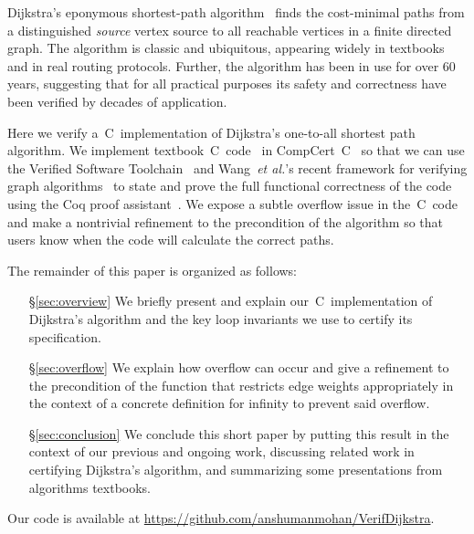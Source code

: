 Dijkstra's eponymous shortest-path algorithm~\cite{DBLP:journals/nm/Dijkstra59} finds
the cost-minimal paths from a distinguished \emph{source} vertex
source to all reachable vertices in a finite directed graph.
The algorithm is classic and ubiquitous, appearing widely in textbooks~\cite{clrs}
and in real routing protocols. Further, the algorithm has been in
use for over $60$ years, suggesting that for all practical purposes
its safety and correctness have been verified by decades of application.


Here we verify a~C~implementation of Dijkstra's one-to-all shortest path algorithm.
We implement textbook~C~code~\cite{clrs} in CompCert~C~\cite{leroy:compcert} so that
we can use the Verified Software Toolchain~\cite{appel:programlogics} and
Wang~\emph{et al.}'s recent framework for verifying graph algorithms~\cite{DBLP:journals/pacmpl/WangCMH19} to state and prove the full functional
correctness of the code using the Coq proof assistant~\cite{coq}.
We expose a subtle overflow issue in the~C~code and make a nontrivial refinement to the precondition of the algorithm so that users know when the code will calculate the correct paths.

The remainder of this paper is organized as follows:
\begin{itemize}
    \item[\S\ref{sec:overview}] We briefly present and explain
    our~C~implementation of Dijkstra's algorithm and the key loop invariants
    we use to certify its specification.
    \item[\S\ref{sec:overflow}] We explain how overflow can occur and give a
    refinement to the precondition of the function that restricts edge weights
    appropriately in the context of a concrete definition for infinity to prevent said overflow.
    \item[\S\ref{sec:conclusion}] We conclude this short paper by putting this result in the context of our
    previous and ongoing work, discussing related work in certifying Dijkstra's algorithm, and summarizing some presentations from algorithms textbooks.
\end{itemize}

\noindent Our code is available at \url{https://github.com/anshumanmohan/VerifDijkstra}.
